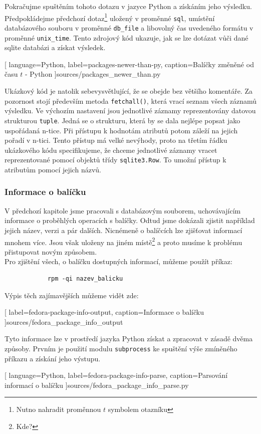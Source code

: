 \documentclass[
  field=inf,
  biblatex,
  glossaries,
  index
]{kidiplom}
\begin{document}
		Pokračujme spuštěním tohoto dotazu v jazyce Python a získáním jeho výsledku. Předpokládejme předchozí dotaz\footnote{Nutno nahradit proměnnou $t$ symbolem otazníku} uložený v proměnné \texttt{sql}, umístění databázového souboru v proměnné \texttt{db\_file} a libovolný čas uvedeného formátu v proměnné \texttt{unix\_time}. Tento zdrojový kód ukazuje, jak se lze dotázat vůči dané sqlite databázi a získat výsledek.

		
		[
			language=Python,
			label=packages-newer-than-py,
			caption={Balíčky změněné od času $t$ - Python}
		]{sources/packages_newer_than.py}

		Ukázkový kód je natolik sebevysvětlující, že se obejde bez většího komentáře. Za pozornost stojí především metoda \texttt{fetchall()}, která vrací seznam všech záznamů výsledku. Ve výchozím nastavení jsou jednotlivé záznamy reprezentovány datovou strukturou \texttt{tuple}. Jedná se o strukturu, která by se dala nejlépe popsat jako uspořádaná n-tice. Při přístupu k hodnotám atributů potom záleží na jejich pořadí v n-tici. Tento přístup má velké nevýhody, proto na třetím řádku ukázkového kódu specifikujeme, že chceme jednotlivé záznamy vracet reprezentované pomocí objektů třídy \texttt{sqlite3.Row}. To umožní přístup k atributům pomocí jejich názvů.

		\subsubsection{Informace o balíčku}
		V předchozí kapitole jsme pracovali s databázovým souborem, uchovávajícím informace o proběhlých operacích s balíčky. Odtud jsme dokázali zjistit například jejich název, verzi a pár dalších. Nicnémeně o balíčcích lze zjišťovat informací mnohem více. Jsou však uloženy na jiném místě\footnote{Kde?} a proto musíme k problému přistupovat novým způsobem.
		\\
		Pro zjištění všech, o balíčku dostupných informací, můžeme použít příkaz:

		\begin{lstlisting}
			rpm -qi nazev_balicku
		\end{lstlisting}

		Výpis těch zajímavějších můžeme vidět zde:
		
		[
			label=fedora-package-info-output,
			caption={Informace o balíčku}
		]{sources/fedora_package_info_output}

		Tyto informace lze v prostředí jazyka Python získat a zpracovat v zásadě dvěma způsoby. Prvním je použití modulu \texttt{subprocess} ke spuštění výše zmíněného příkazu a získání jeho výstupu.
		
		[
			language=Python,
			label=fedora-package-info-parse,
			caption={Parsování informací o balíčku}
		]{sources/fedora_package_info_parse.py}
\end{document}

